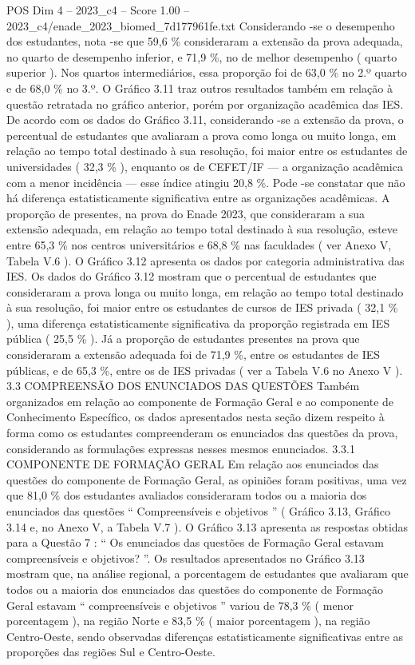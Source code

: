 \begin{textsample}{POS Dim 4 – 2023\_c4 – Score 1.00 – 2023\_c4/enade\_2023\_biomed\_7d177961fe.txt}
Considerando -se o desempenho dos estudantes, nota -se que 59,6 \% consideraram a extensão da prova adequada, no quarto de desempenho inferior, e 71,9 \%, no de melhor desempenho ( quarto superior ).
Nos quartos intermediários, essa proporção foi de 63,0 \% no 2.º quarto e de 68,0 \% no 3.º.
O Gráfico 3.11 traz outros resultados também em relação à questão retratada no gráfico anterior, porém por organização acadêmica das IES.
De acordo com os dados do Gráfico 3.11, considerando -se a extensão da prova, o percentual de estudantes que avaliaram a prova como longa ou muito longa, em relação ao tempo total destinado à sua resolução, foi maior entre os estudantes de universidades ( 32,3 \% ), enquanto os de CEFET/IF — a organização acadêmica com a menor incidência — esse índice atingiu 20,8 \%.
Pode -se constatar que não há diferença estatisticamente significativa entre as organizações acadêmicas.
A proporção de presentes, na prova do Enade 2023, que consideraram a sua extensão adequada, em relação ao tempo total destinado à sua resolução, esteve entre 65,3 \% nos centros universitários e 68,8 \% nas faculdades ( ver Anexo V, Tabela V.6 ).
O Gráfico 3.12 apresenta os dados por categoria administrativa das IES.
Os dados do Gráfico 3.12 mostram que o percentual de estudantes que consideraram a prova longa ou muito longa, em relação ao tempo total destinado à sua resolução, foi maior entre os estudantes de cursos de IES privada ( 32,1 \% ), uma diferença estatisticamente significativa da proporção registrada em IES pública ( 25,5 \% ).
Já a proporção de estudantes presentes na prova que consideraram a extensão adequada foi de 71,9 \%, entre os estudantes de IES públicas, e de 65,3 \%, entre os de IES privadas ( ver a Tabela V.6 no Anexo V ). 3.3 COMPREENSÃO DOS ENUNCIADOS DAS QUESTÕES Também organizados em relação ao componente de Formação Geral e ao componente de Conhecimento Específico, os dados apresentados nesta seção dizem respeito à forma como os estudantes compreenderam os enunciados das questões da prova, considerando as formulações expressas nesses mesmos enunciados. 3.3.1 COMPONENTE DE FORMAÇÃO GERAL Em relação aos enunciados das questões do componente de Formação Geral, as opiniões foram positivas, uma vez que 81,0 \% dos estudantes avaliados consideraram todos ou a maioria dos enunciados das questões “ Compreensíveis e objetivos ” ( Gráfico 3.13, Gráfico 3.14 e, no Anexo V, a Tabela V.7 ).
O Gráfico 3.13 apresenta as respostas obtidas para a Questão 7 : “ Os enunciados das questões de Formação Geral estavam compreensíveis e objetivos? ”.
Os resultados apresentados no Gráfico 3.13 mostram que, na análise regional, a porcentagem de estudantes que avaliaram que todos ou a maioria dos enunciados das questões do componente de Formação Geral estavam “ compreensíveis e objetivos ” variou de 78,3 \% ( menor porcentagem ), na região Norte e 83,5 \% ( maior porcentagem ), na região Centro-Oeste, sendo observadas diferenças estatisticamente significativas entre as proporções das regiões Sul e Centro-Oeste.

\end{textsample}
